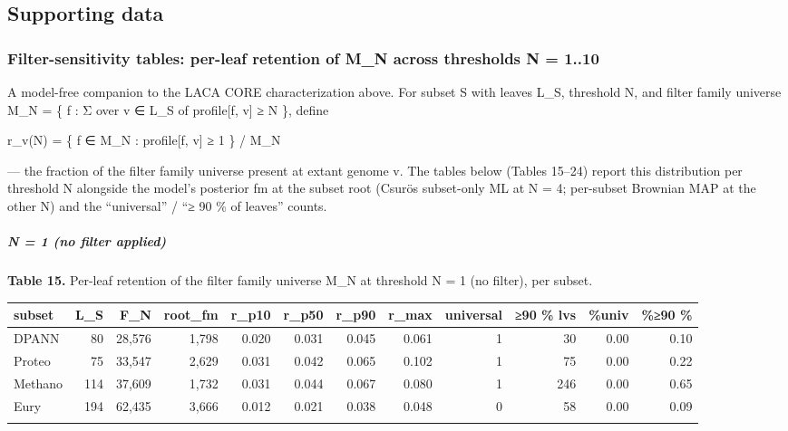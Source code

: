 \documentclass[
  10pt,
]{article}
\begin{document}
\subsection{Supporting data}\label{supporting-data}

\subsubsection{Filter-sensitivity tables: per-leaf retention of M\_N
across thresholds N =
1..10}\label{filter-sensitivity-tables-per-leaf-retention-of-m_n-across-thresholds-n--110}

A model-free companion to the LACA CORE characterization above. For
subset S with leaves L\_S, threshold N, and filter family universe M\_N
= \{ f : Σ over v ∈ L\_S of profile{[}f, v{]} ≥ N \}, define

r\_v(N) = \textbar\{ f ∈ M\_N : profile{[}f, v{]} ≥ 1 \}\textbar{} /
\textbar M\_N\textbar{}

--- the fraction of the filter family universe present at extant genome
v. The tables below (Tables 15--24) report this distribution per
threshold N alongside the model's posterior fm at the subset root
(Csurös subset-only ML at N = 4; per-subset Brownian MAP at the other N)
and the ``universal'' / ``≥ 90 \% of leaves'' counts.

\subparagraph{N = 1 (no filter applied)}\label{n--1-no-filter-applied}

\textbf{Table 15.} Per-leaf retention of the filter family universe M\_N
at threshold N = 1 (no filter), per subset.

\begin{center}
\begin{adjustbox}{max width=\textwidth}
\begin{tabular}{@{}lrrrrrrrrrrr@{}}
\toprule\noalign{}
subset & L\_S & F\_N & root\_fm & r\_p10 & r\_p50 & r\_p90 & r\_max &
universal & ≥90 \% lvs & \%univ & \%≥90 \% \\
\midrule\noalign{}
DPANN & 80 & 28,576 & 1,798 & 0.020 & 0.031 & 0.045 & 0.061 & 1 & 30 &
0.00 & 0.10 \\
Proteo & 75 & 33,547 & 2,629 & 0.031 & 0.042 & 0.065 & 0.102 & 1 & 75 &
0.00 & 0.22 \\
Methano & 114 & 37,609 & 1,732 & 0.031 & 0.044 & 0.067 & 0.080 & 1 & 246
& 0.00 & 0.65 \\
Eury & 194 & 62,435 & 3,666 & 0.012 & 0.021 & 0.038 & 0.048 & 0 & 58 &
0.00 & 0.09 \\
\bottomrule\noalign{}
\end{tabular}
\end{adjustbox}
\end{center}
\end{document}
